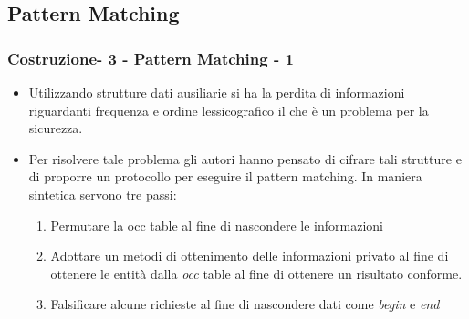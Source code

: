 \documentclass{beamer}
\begin{document}
\subsection{Pattern Matching}
\begin{frame}
\frametitle{Costruzione- 3 - Pattern Matching - 1}
\begin{itemize}
	\item Utilizzando strutture dati ausiliarie si ha la perdita di informazioni riguardanti frequenza e ordine lessicografico il che è un problema per la sicurezza.\pause
	\item Per risolvere tale problema gli autori hanno pensato di cifrare tali strutture e di proporre un protocollo per eseguire il pattern matching. In maniera sintetica servono tre passi:\pause
	\begin{enumerate}
		\item Permutare la occ table al fine di nascondere le informazioni
		\item Adottare un metodi di ottenimento delle informazioni privato al fine di ottenere le entità dalla \textit{occ} table al fine di ottenere un risultato conforme.\pause
		\item Falsificare alcune richieste al fine di nascondere dati come \textit{begin} e \textit{end}\pause
		
	\end{enumerate}	 
\end{itemize}
\end{frame}
\end{document}
